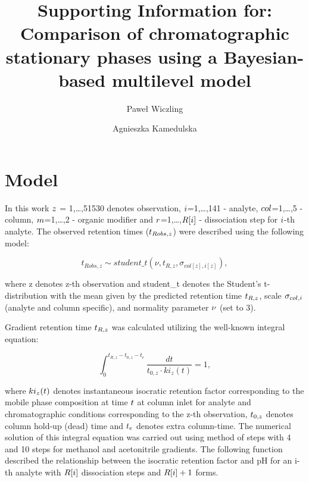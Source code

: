 \documentclass[
]{article}
\title{Supporting Information for:\\
Comparison of chromatographic stationary phases using a Bayesian-based
multilevel model}
\author{Paweł Wiczling}
\author{Agnieszka Kamedulska}
\affil{%
                  Department of Biopharmaceutics and Pharmacodynamics,
                  Medical University of Gdańsk, Al. Gen.~Hallera 107,
                  80-416 Gdańsk, Poland
              }
\date{}
\renewcommand*\contentsname{Table of contents}
\newcommand\contentsname{Table of contents}
\begin{document}
\maketitle
\ifdefined\Shaded\renewenvironment{Shaded}{\begin{tcolorbox}[interior hidden, sharp corners, enhanced, frame hidden, boxrule=0pt, breakable, borderline west={3pt}{0pt}{shadecolor}]}{\end{tcolorbox}}\fi

\renewcommand*\contentsname{Table of contents}
{
\hypersetup{linkcolor=}
\setcounter{tocdepth}{3}
\tableofcontents
}
\hypertarget{model}{%
\section{Model}\label{model}}

In this work \(\small z\) = 1,\ldots,51530 denotes observation,
\(\small i\)=1,\ldots,141 - analyte, \(\small col\)=1,\ldots,5 - column,
\(\small m\)=1,\ldots,2 - organic modifier and
\(\small r\)=1,\ldots,\(\small R[i]\) - dissociation step for
\(\small i\)-th analyte. The observed retention times
(\(\small t_{Robs,z}\)) were described using the following model:

\[
t_{Robs,z} \sim student\_t(\nu, t_{R,z} ,\sigma_{col[z],i[z]}),
\]

where z denotes z-th observation and student\_t denotes the Student's
t-distribution with the mean given by the predicted retention time
\(\small t_{R,z}\), scale \(\small \sigma_{col,i}\) (analyte and column
specific), and normality parameter \(\small \nu\) (set to 3).

Gradient retention time \(\small t_{R,z}\) was calculated utilizing the
well-known integral equation:

\[
\int_0^{t_{R,z}-t_{0,z}-t_e}\frac{dt}{t_{0,z}\cdot ki_z(t) }=1,
\]

where \(\small ki_z(t)\) denotes instantaneous isocratic retention
factor corresponding to the mobile phase composition at time
\(\small t\) at column inlet for analyte and chromatographic conditions
corresponding to the z-th observation, \(\small t_{0,z}\) denotes column
hold-up (dead) time and \(\small t_e\) denotes extra column-time. The
numerical solution of this integral equation was carried out using
method of steps with 4 and 10 steps for methanol and acetonitrile
gradients. The following function described the relationship between the
isocratic retention factor and pH for an i-th analyte with
\(\small R[i]\) dissociation steps and \(\small R[i]+1\) forms.
\end{document}
